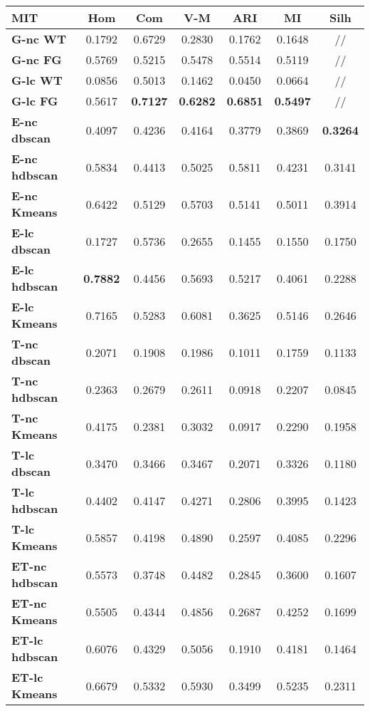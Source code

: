\begin{table}[H]
	\begin{tabular}{| l | c | c | c | c | c | c |}
	\hline
	\textbf{MIT}  & \textbf{Hom} & \textbf{Com} & \textbf{V-M}  & \textbf{ARI}  & \textbf{MI}  & \textbf{Silh} \\ [2ex] \hline
	\textbf{G-nc WT} & 0.1792 & 0.6729 & 0.2830 & 0.1762 & 0.1648 & // \\ [2ex]
	 \hline
	\textbf{G-nc FG} & 0.5769 & 0.5215 & 0.5478 & 0.5514 & 0.5119 & // \\ [2ex]
	 \hline	
	\textbf{G-lc WT} & 0.0856 & 0.5013 & 0.1462 & 0.0450 & 0.0664 & // \\ [2ex]
	 \hline	
	\textbf{G-lc FG} & 0.5617 & \textbf{0.7127} & \textbf{0.6282} & \textbf{0.6851} & \textbf{0.5497} & // \\ [2ex]
	\hline

	\textbf{E-nc dbscan} & 0.4097 & 0.4236 & 0.4164 & 0.3779 & 0.3869 & \textbf{0.3264}\\ [2ex]
	 \hline 
	\textbf{E-nc hdbscan} & 0.5834 & 0.4413 & 0.5025 & 0.5811 & 0.4231 & 0.3141\\ [2ex]
	 \hline
	\textbf{E-nc Kmeans} & 0.6422 & 0.5129 & 0.5703 & 0.5141 & 0.5011 & 0.3914\\ [2ex]
	 \hline	
	\textbf{E-lc dbscan} & 0.1727 & 0.5736 & 0.2655 & 0.1455 & 0.1550 & 0.1750\\ [2ex]
	\hline
	\textbf{E-lc hdbscan} & \textbf{0.7882} & 0.4456 & 0.5693 & 0.5217 & 0.4061 & 0.2288\\ [2ex]
	\hline
	\textbf{E-lc Kmeans} & 0.7165 & 0.5283 & 0.6081 & 0.3625 & 0.5146 & 0.2646\\ [2ex]
	\hline
	
	\textbf{T-nc dbscan} & 0.2071 & 0.1908 & 0.1986 & 0.1011 & 0.1759 & 0.1133\\ [2ex]
	 \hline 
	\textbf{T-nc hdbscan} & 0.2363 & 0.2679 & 0.2611 & 0.0918 & 0.2207 & 0.0845\\ [2ex]
	 \hline
	\textbf{T-nc Kmeans} & 0.4175 & 0.2381 & 0.3032 & 0.0917 & 0.2290 & 0.1958\\ [2ex]
	 \hline	
	\textbf{T-lc dbscan} & 0.3470 & 0.3466 & 0.3467 & 0.2071 & 0.3326 & 0.1180\\ [2ex]
	\hline
	\textbf{T-lc hdbscan} & 0.4402 & 0.4147 & 0.4271 & 0.2806 & 0.3995 & 0.1423\\ [2ex]
	\hline
	\textbf{T-lc Kmeans} & 0.5857 & 0.4198 & 0.4890 & 0.2597 & 0.4085 & 0.2296\\ [2ex]
	\hline
	
	\textbf{ET-nc hdbscan} & 0.5573 & 0.3748 & 0.4482 & 0.2845 & 0.3600 & 0.1607\\ [2ex]
	 \hline
	\textbf{ET-nc Kmeans} & 0.5505 & 0.4344 & 0.4856 & 0.2687 & 0.4252 & 0.1699\\ [2ex]
	 \hline	
	\textbf{ET-lc hdbscan} & 0.6076 & 0.4329 & 0.5056 & 0.1910 & 0.4181 & 0.1464\\ [2ex]
	\hline
	\textbf{ET-lc Kmeans} & 0.6679 & 0.5332 & 0.5930 & 0.3499 & 0.5235 & 0.2311\\ [2ex]
	\hline	
	

\end{tabular}
\end{table}
